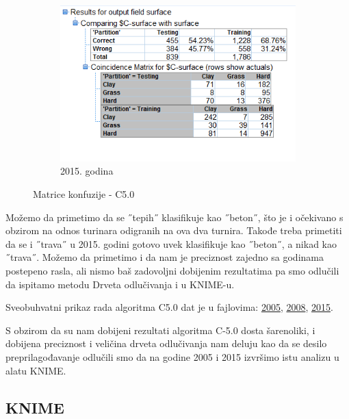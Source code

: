 \documentclass[a4paper]{article}
\begin{document}
\begin{figure}[H]
	\begin{subfigure}[h]{\textwidth}
		\begin{center}
			\includegraphics[scale=0.50]{Klasifikacija/C50/Analysis_Surface2015.png}
		\end{center}
		\caption{2015. godina}
		\label{fig:MatricaKnfuzijeC502015}
	\end{subfigure}
	
	\caption{Matrice konfuzije - C5.0}
	\label{fig:MatricaKnfuzijeC50}
\end{figure}

Možemo da primetimo da se ˝tepih˝ klasifikuje kao ˝beton˝, što je i očekivano s obzirom na odnos turinara odigranih na ova dva turnira. Takođe treba primetiti da se i ˝trava˝ u 2015. godini gotovo uvek klasifikuje kao ˝beton˝, a nikad kao ˝trava˝. Možemo da primetimo i da nam je preciznost zajedno sa godinama postepeno rasla, ali nismo baš zadovoljni dobijenim rezultatima pa smo odlučili da ispitamo metodu Drveta odlučivanja i u KNIME-u. 

Sveobuhvatni prikaz rada algoritma C5.0 dat je u fajlovima: \href{file:./Klasifikacija/C50/Summary_Surface2005.html}{2005}, \href{file:./Klasifikacija/C50/Summary_Surface2008.html}{2008}, \href{file:./Klasifikacija/C50/Summary_Surface2005.html}{2015}.  

S obzirom da su nam dobijeni rezultati algoritma C-5.0 dosta šarenoliki, i dobijena preciznost i veličina drveta odlučivanja nam deluju kao da se desilo preprilagođavanje odlučili smo da na godine 2005 i 2015 izvršimo istu analizu u alatu KNIME.

\subsection{KNIME}
\end{document}
